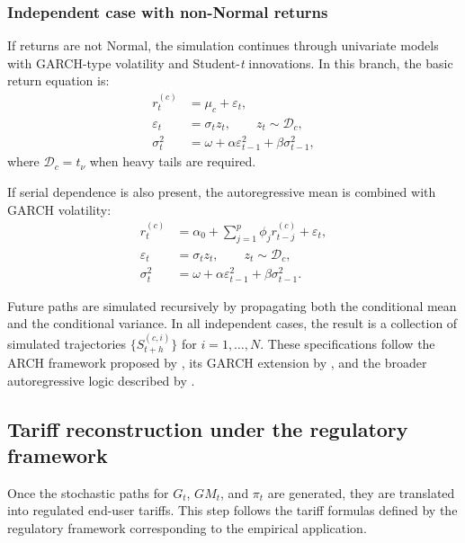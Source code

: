 \documentclass[authoryear,preprint,review,10pt]{elsarticle}
\begin{document}
\subsubsection{Independent case with non-Normal returns}
\label{appendix:independent_nonnormal}

If returns are not Normal, the simulation continues through univariate models with GARCH-type volatility and Student-\emph{t} innovations. In this branch, the basic return equation is:
\begin{align}
    r_t^{(c)} &= \mu_c + \varepsilon_t, \\
    \varepsilon_t &= \sigma_t z_t,\qquad z_t \sim \mathcal{D}_{c}, \\
    \sigma_t^2 &= \omega + \alpha \varepsilon_{t-1}^2 + \beta \sigma_{t-1}^2,
\end{align}
where $\mathcal{D}_{c}=t_\nu$ when heavy tails are required.

If serial dependence is also present, the autoregressive mean is combined with GARCH volatility:
\begin{align}
    r_t^{(c)} &= \alpha_0 + \sum_{j=1}^p \phi_j r_{t-j}^{(c)} + \varepsilon_t,\\
    \varepsilon_t &= \sigma_t z_t,\qquad z_t \sim \mathcal{D}_{c},\\
    \sigma_t^2 &= \omega + \alpha \varepsilon_{t-1}^2 + \beta \sigma_{t-1}^2.
\end{align}

Future paths are simulated recursively by propagating both the conditional mean and the conditional variance. In all independent cases, the result is a collection of simulated trajectories $\{S_{t+h}^{(c,i)}\}$ for $i=1,\dots,N$. These specifications follow the ARCH framework proposed by \citet{engle1982autoregressive}, its GARCH extension by \citet{bollerslev1986generalized}, and the broader autoregressive logic described by \citet{box2015time}.

\subsection{Tariff reconstruction under the regulatory framework}
\label{appendix:tariff_reconstruction}

Once the stochastic paths for $G_t$, $GM_t$, and $\pi_t$ are generated, they are translated into regulated end-user tariffs. This step follows the tariff formulas defined by the regulatory framework corresponding to the empirical application.
\end{document}
